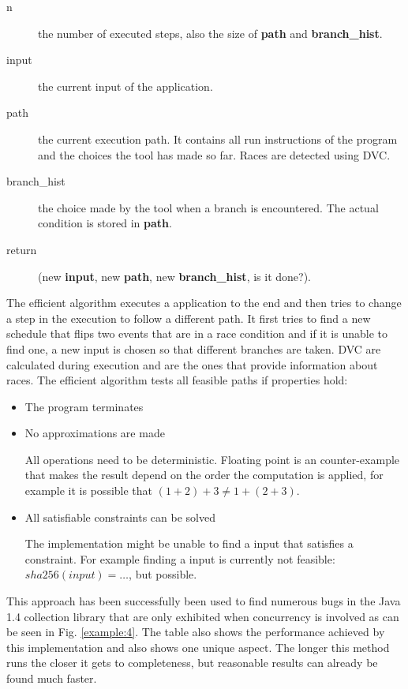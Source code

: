 \documentclass[10pt]{llncs}
\begin{document}
\begin{description}
	\item[n] the number of executed steps, also the size of \textbf{path} and \textbf{branch\_hist}.
	\item[input] the current input of the application.
	\item[path] the current execution path. It contains all run instructions of the program and the choices the tool has made so far. Races are detected using DVC.
	\item[branch\_hist] the choice made by the tool when a branch is encountered. The actual condition is stored in \textbf{path}.
	\item[return] (new \textbf{input}, new \textbf{path}, new \textbf{branch\_hist}, is it done?).
\end{description}

The efficient algorithm executes a application to the end and then tries to change a step in the execution to follow a different path. It first tries to find a new schedule that flips two events that are in a race condition and if it is unable to find one, a new input is chosen so that different branches are taken. DVC are calculated during execution and are the ones that provide information about races. The efficient algorithm tests all feasible paths if properties hold:

\begin{itemize}
	\item The program terminates
	\item No approximations are made
	
	All operations need to be deterministic. Floating point is an counter-example that makes the result depend on the order the computation is applied, for example it is possible that $(1+2)+3 \neq 1+(2+3)$.
	\item All satisfiable constraints can be solved
	
	The implementation might be unable to find a input that satisfies a constraint. For example finding a input is currently not feasible: $sha256(input) = \dots$, but possible.
\end{itemize}

This approach has been successfully been used to find numerous bugs in the Java 1.4 collection library that are only exhibited when concurrency is involved as can be seen in Fig. \ref{example:4}. The table also shows the performance achieved by this implementation and also shows one unique aspect. The longer this method runs the closer it gets to completeness, but reasonable results can already be found much faster.
\end{document}
